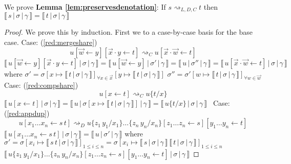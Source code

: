 \documentclass[a4paper,UKenglish,cleveref, autoref]{lipics-v2019}
\newcommand{\app}[2]{#1 \, #2}
\newcommand{\share}[3]{#1 [#2 \leftarrow #3]}
\newcommand{\sub}[3]{#1 \{ #2 / #3 \}}
\newcommand{\readbackwmap}[3]{\llbracket \, #1 \, \vert \, #2 \, \vert \, #3  \, \rrbracket }
\begin{document}
\noindent We prove {\bf Lemma \ref{lem:preservesdenotation}}: If $s \rightsquigarrow_{L, D, C} t$ then $\readbackwmap{s}{\sigma}{\gamma} = \readbackwmap{t}{\sigma}{\gamma}$

\begin{proof}
We prove this by induction. First we to a case-by-case basis for the base case.
\newline
\newline
Case: (\ref{red:mergeshare})
$$\share{\share{u}{\vec{w}}{y}}{\vec{x} \cdot y}{t} \rightsquigarrow_{C} \share{u}{\vec{x} \cdot \vec{w}}{t} $$
$\readbackwmap{\share{\share{u}{\vec{w}}{y}}{\vec{x} \cdot y}{t}}{\sigma}{\gamma} = \readbackwmap{\share{u}{\vec{w}}{y}}{\sigma'}{\gamma} = \readbackwmap{u}{\sigma''}{\gamma} = \readbackwmap{\share{u}{\vec{x} \cdot \vec{w}}{t}}{\sigma}{\gamma}$
\newline
where
\newline
$\sigma' = \sigma [x \mapsto \readbackwmap{t}{\sigma}{\gamma}]_{\forall x \in \vec{x}} [y \mapsto \readbackwmap{t}{\sigma}{\gamma}]$
\newline
$\sigma'' = \sigma' [w \mapsto \readbackwmap{t}{\sigma}{\gamma}]_{\forall w \in \vec{w}}$
\newline
\newline
\newline
Case: (\ref{red:compshare})
$$\share{u}{x}{t} \rightsquigarrow_{C} \sub{u}{t}{x}$$
$\readbackwmap{\share{u}{x}{t}}{\sigma}{\gamma} = \readbackwmap{u}{\sigma[x \mapsto \readbackwmap{t}{\sigma}{\gamma}]}{\gamma} = \readbackwmap{\sub{u}{t}{x}}{\sigma}{\gamma} $\
\newline
\newline
Case: (\ref{red:appdup})
$$\share{u}{x_{1} \dots x_{n}}{\app{s}{t}} \rightsquigarrow_{D} \share{\share{\sub{\sub{u}{\app{z_{1}}{y_{1}}}{x_{1}}\dots}{\app{z_{n}}{y_{n}}}{x_{n}}}{z_{1} \dots z_{n}}{s}}{y_{1} \dots y_{n}}{t}$$
$\readbackwmap{\share{u}{x_{1} \dots x_{n}}{\app{s}{t}}}{\sigma}{\gamma} = \readbackwmap{u}{\sigma'}{\gamma}$
\newline
where
\newline
$\sigma' = \sigma [ x_{i} \mapsto \readbackwmap{\app{s}{t}}{\sigma}{\gamma}]_{1 \leq i \leq n} = \sigma [x_{i} \mapsto \app{\readbackwmap{s}{\sigma}{\gamma}}{\readbackwmap{t}{\sigma}{\gamma}}]_{1 \leq i \leq n}$
\newline
\newline
$\readbackwmap{ \share{\share{\sub{\sub{u}{\app{z_{1}}{y_{1}}}{x_{1}}\dots}{\app{z_{n}}{y_{n}}}{x_{n}}}{z_{1} \dots z_{n}}{s}}{y_{1} \dots y_{n}}{t}}{\sigma}{\gamma}$

\end{proof}
\end{document}
